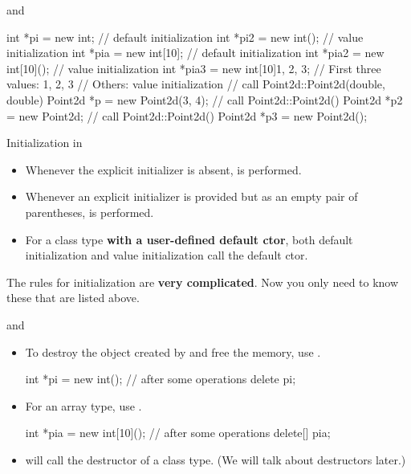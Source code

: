 \documentclass{beamer}
\begin{document}
\begin{frame}[fragile]{\new and \delete}
    \begin{cpp}
int *pi = new int;                // default initialization
int *pi2 = new int();             // value initialization
int *pia = new int[10];           // default initialization
int *pia2 = new int[10]();        // value initialization
int *pia3 = new int[10]{1, 2, 3}; // First three values: 1, 2, 3
                                  // Others: value initialization
// call Point2d::Point2d(double, double)
Point2d *p = new Point2d(3, 4);
// call Point2d::Point2d()
Point2d *p2 = new Point2d;
// call Point2d::Point2d()
Point2d *p3 = new Point2d();
    \end{cpp}
\end{frame}

\begin{frame}{Initialization in \new}
    \begin{itemize}
        \item Whenever the explicit initializer is absent,  is performed.
        \item Whenever an explicit initializer is provided but as an empty pair of parentheses,  is performed.
        \item For a class type \textbf{with a user-defined default ctor}, both default initialization and value initialization call the default ctor.
    \end{itemize}
    The rules for initialization are \textbf{very complicated}. Now you only need to know these that are listed above.
\end{frame}

\begin{frame}[fragile]{\new and \delete}
    \begin{itemize}
        \item To destroy the object created by \new and free the memory, use \delete.
        \begin{cpp}
int *pi = new int();
// after some operations
delete pi;
        \end{cpp}
        \item For an array type, use \ttt{[]}.
        \begin{cpp}
int *pia = new int[10]();
// after some operations
delete[] pia;
        \end{cpp}
        \item \delete will call the destructor of a class type. (We will talk about destructors later.)
    \end{itemize}
\end{frame}
\end{document}
